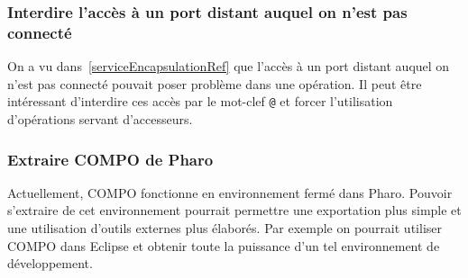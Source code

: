 \documentclass[11pt,a4paper,openany,oneside]{book}
\begin{document}
\subsubsection{Interdire l'accès à un port distant auquel on n'est pas connecté}
On a vu dans~\ref{serviceEncapsulationRef} que l'accès à un port distant auquel on n'est pas connecté pouvait poser problème dans une opération. Il peut être intéressant d'interdire ces accès par le mot-clef \texttt{@} et forcer l'utilisation d'opérations servant d'accesseurs.

\subsubsection{Extraire COMPO de Pharo}
Actuellement, COMPO fonctionne en environnement fermé dans Pharo. Pouvoir s'extraire de cet environnement pourrait permettre une exportation plus simple et une utilisation d'outils externes plus élaborés. Par exemple on pourrait utiliser COMPO dans Eclipse et obtenir toute la puissance d'un tel environnement de développement.




\end{document}
